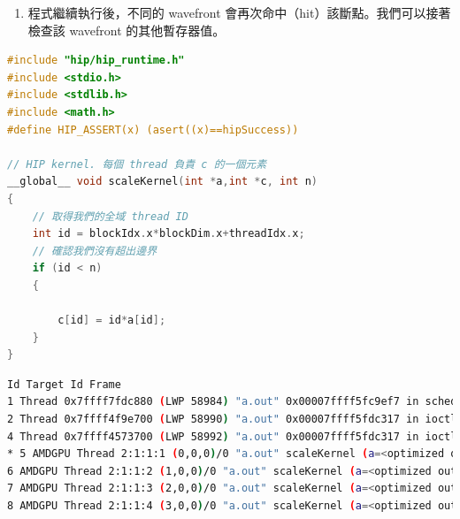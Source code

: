 \begin{enumerate}
    繼續看我們的範例，我們觀察到暫存器 v3 將值寫回至主記憶體前，儲存了最終結果。因此，透過檢查的第 4 行，我們可以查看 wavefront 0 中所有64個 threads 的暫存器 v3 的值。舉例來說，第三個數值為 0x4，對應於該 wavefront 的 thread ID 2。具體而言，thread ID 2 會從輸入陣列  中讀取數值 2，將其與自身的 thread ID（值為2）相乘，最終輸出 0x4。

    \item 程式繼續執行後，不同的 wavefront 會再次命中（hit）該斷點。我們可以接著檢查該 wavefront 的其他暫存器值。

\end{enumerate}

\begin{lstlisting}[language=C, caption={純量乘法kernel}, label={lst:Scalar multiply kernel}]
#include "hip/hip_runtime.h"
#include <stdio.h>
#include <stdlib.h>
#include <math.h>
#define HIP_ASSERT(x) (asert((x)==hipSuccess))

// HIP kernel. 每個 thread 負責 c 的一個元素
__global__ void scaleKernel(int *a,int *c, int n)
{
    // 取得我們的全域 thread ID
    int id = blockIdx.x*blockDim.x+threadIdx.x;
    // 確認我們沒有超出邊界
    if (id < n)
    {
    
        c[id] = id*a[id];
    }
}
\end{lstlisting}

\begin{lstlisting}[language=bash, caption={info threads命令的輸出結果}, label={lst:Output of info threads command}]
Id Target Id Frame
1 Thread 0x7ffff7fdc880 (LWP 58984) "a.out" 0x00007ffff5fc9ef7 in sched_yield () from /lib/x86_64-linux-gnu/libc.so.6
2 Thread 0x7ffff4f9e700 (LWP 58990) "a.out" 0x00007ffff5fdc317 in ioctl () from /lib/x86_64-linux-gnu/libc.so.6
4 Thread 0x7ffff4573700 (LWP 58992) "a.out" 0x00007ffff5fdc317 in ioctl () from /lib/x86_64-linux-gnu/libc.so.6
* 5 AMDGPU Thread 2:1:1:1 (0,0,0)/0 "a.out" scaleKernel (a=<optimized out>, c=<optimized out>, n=<optimized out>) at vadd_hip.cpp:20
6 AMDGPU Thread 2:1:1:2 (1,0,0)/0 "a.out" scaleKernel (a=<optimized out>, c=<optimized out>, n=<optimized out>) at vadd_hip.cpp:20
7 AMDGPU Thread 2:1:1:3 (2,0,0)/0 "a.out" scaleKernel (a=<optimized out>, c=<optimized out>, n=<optimized out>) at vadd_hip.cpp:20
8 AMDGPU Thread 2:1:1:4 (3,0,0)/0 "a.out" scaleKernel (a=<optimized out>, c=<optimized out>, n=<optimized out>) at vadd_hip.cpp:20
\end{lstlisting}

